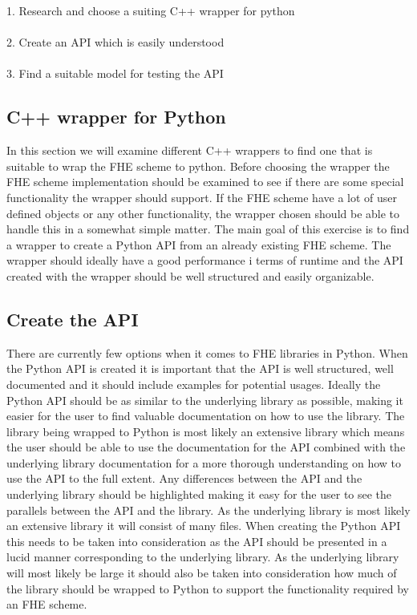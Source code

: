 1. Research and choose a suiting C++ wrapper for python\\\\
2. Create an API which is easily understood\\\\
3. Find a suitable model for testing the API

\subsection{C++ wrapper for Python}
In this section we will examine different C++ wrappers to find one that is suitable to wrap the FHE scheme to python. Before choosing the wrapper the FHE scheme implementation should be examined to see if there are some special functionality the wrapper should support. If the FHE scheme have a lot of user defined objects or any other functionality, the wrapper chosen should be able to handle this in a somewhat simple matter. The main goal of this exercise is to find a wrapper to create a Python API from an already existing FHE scheme. The wrapper should ideally have a good performance i terms of runtime and the API created with the wrapper should be well structured and easily organizable.

\subsection{Create the API}
There are currently few options when it comes to FHE libraries in Python. When the Python API is created it is important that the API is well structured, well documented and it should include examples for potential usages. Ideally the Python API should be as similar to the underlying library as possible, making it easier for the user to find valuable documentation on how to use the library. The library being wrapped to Python is most likely an extensive library which means the user should be able to use the documentation for the API combined with the underlying library documentation for a more thorough understanding on how to use the API to the full extent. Any differences between the API and the underlying library should be highlighted making it easy for the user to see the parallels between the API and the library. As the underlying library is most likely an extensive library it will consist of many files. When creating the Python API this needs to be taken into consideration as the API should be presented in a lucid manner corresponding to the underlying library. As the underlying library will most likely be large it should also be taken into consideration how much of the library should be wrapped to Python to support the functionality required by an FHE scheme.

